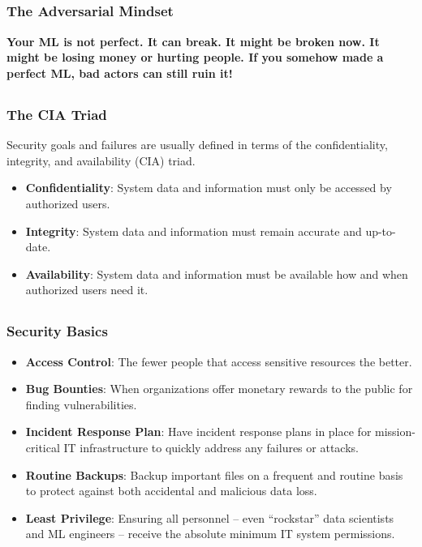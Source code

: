 \documentclass[11pt,
               aspectratio=169,
               hyperref={colorlinks}
               ]{beamer}
\begin{document}
	\subsection*{}
	\begin{frame}
		
		\frametitle{The Adversarial Mindset}
			
		\LARGE{\textbf{Your ML is not perfect. It can break. It might be broken now. It might be losing money or hurting people. If you somehow made a perfect ML, bad actors can still ruin it!}}
			
	\end{frame}	
	
	\subsection*{}
	\begin{frame}
		
		\frametitle{The CIA Triad}
		
		Security goals and failures are usually defined in terms of the confidentiality, integrity, and availability (CIA) triad.
		
		\begin{itemize}
			\item \textbf{Confidentiality}: System data and information must only be accessed by authorized users.
			\item \textbf{Integrity}: System data and information must remain accurate and up-to-date.
			\item \textbf{Availability}: System data and information must be available how and when authorized users need it.
		\end{itemize}

	\end{frame}	

	\subsection*{}
	\begin{frame}
		
		\frametitle{Security Basics}
		
		\begin{itemize}
			\item \textbf{Access Control}: The fewer people that access sensitive resources the better.
			\item \textbf{Bug Bounties}: When organizations offer monetary rewards to the public for finding vulnerabilities.
			\item \textbf{Incident Response Plan}: Have incident response plans in place for mission-critical IT infrastructure to quickly address any failures or attacks.
			\item \textbf{Routine Backups}: Backup important files on a frequent and routine basis to protect against both accidental and malicious data loss.	
			\item \textbf{Least Privilege}: Ensuring all personnel -- even “rockstar” data scientists and ML engineers -- receive the absolute minimum IT system permissions.
		\end{itemize}

	\end{frame}
\end{document}
